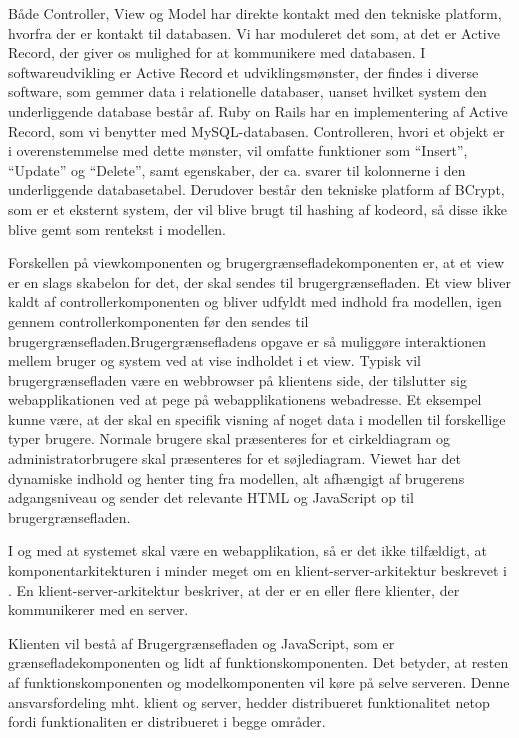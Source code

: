 Både Controller, View og Model har direkte kontakt med den tekniske platform, hvorfra der er kontakt til databasen. Vi har moduleret det som, at det er Active Record, der giver os mulighed for at kommunikere med databasen. I softwareudvikling er Active Record et udviklingsmønster, der findes i diverse software, som gemmer data i relationelle databaser, uanset hvilket system den underliggende database består af. Ruby on Rails har en implementering af Active Record, som vi benytter med MySQL-databasen. Controlleren, hvori et objekt er i overenstemmelse med dette mønster, vil omfatte funktioner som ``Insert'', ``Update'' og ``Delete'', samt egenskaber, der ca. svarer til kolonnerne i den underliggende databasetabel.\cite{activerecordwiki} Derudover består den tekniske platform af BCrypt, som er et eksternt system, der vil blive brugt til hashing af kodeord, så disse ikke blive gemt som rentekst i modellen.

Forskellen på viewkomponenten og brugergrænsefladekomponenten er, at et view er en slags skabelon for det, der skal sendes til brugergrænsefladen. Et view bliver kaldt af controllerkomponenten og bliver udfyldt med indhold fra modellen, igen gennem controllerkomponenten før den sendes til brugergrænsefladen.Brugergrænsefladens opgave er så muliggøre interaktionen mellem bruger og system ved at vise indholdet i et view. Typisk vil brugergrænsefladen være en webbrowser på klientens side, der tilslutter sig webapplikationen ved at pege på webapplikationens webadresse. Et eksempel kunne være, at der skal en specifik visning af noget data i modellen til forskellige typer brugere. Normale brugere skal præsenteres for et cirkeldiagram og administratorbrugere skal præsenteres for et søjlediagram. Viewet har det dynamiske indhold og henter ting fra modellen, alt afhængigt af brugerens adgangsniveau og sender det relevante HTML og JavaScript op til brugergrænsefladen. 

I og med at systemet skal være en webapplikation, så er det ikke tilfældigt, at komponentarkitekturen i  minder meget om en klient-server-arkitektur beskrevet i . En klient-server-arkitektur beskriver, at der er en eller flere klienter, der kommunikerer med en server. 

Klienten vil bestå af Brugergrænsefladen og JavaScript, som er grænsefladekomponenten og lidt af funktionskomponenten. Det betyder, at resten af funktionskomponenten og modelkomponenten vil køre på selve serveren. Denne ansvarsfordeling mht. klient og server, hedder distribueret funktionalitet netop fordi funktionaliten er distribueret i begge områder.
